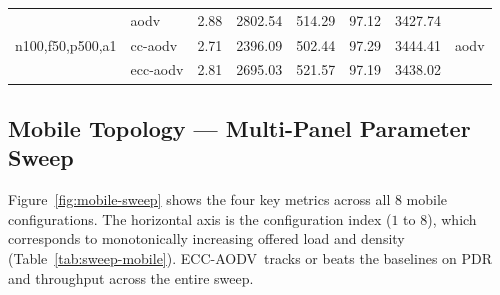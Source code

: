 \documentclass[11pt,a4paper]{article}
\newcommand{\ecc}{ECC-AODV}
\begin{document}
\begin{table}[h]
\begin{tabular}{l l r r r r r l}
\midrule
\multirow{3}{*}{n100,f50,p500,a1}
 & aodv     & \cellcolor{lightgreen}2.88  & \cellcolor{lightgreen}2802.54 & 514.29                       & \cellcolor{lightgreen}97.12 & \cellcolor{lightgreen}3427.74 & \multirow{3}{*}{aodv} \\
 & cc-aodv  & 2.71                        & 2396.09                       & \cellcolor{lightgreen}502.44 & 97.29                       & 3444.41                       & \\
 & ecc-aodv & 2.81                        & 2695.03                       & 521.57                       & 97.19                       & 3438.02                       & \\
\bottomrule
\end{tabular}
\end{table}

\clearpage

\subsection{Mobile Topology — Multi-Panel Parameter Sweep}

Figure~\ref{fig:mobile-sweep} shows the four key metrics across all $8$
mobile configurations. The horizontal axis is the configuration index ($1$ to
$8$), which corresponds to monotonically increasing offered load and
density (Table~\ref{tab:sweep-mobile}). \ecc\ tracks or beats the baselines on
PDR and throughput across the entire sweep.
\end{document}
